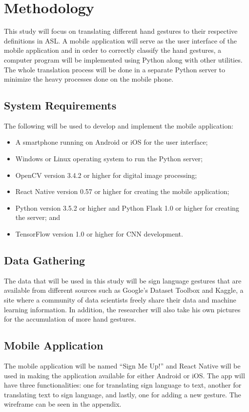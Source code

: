 \documentclass[journal]{./IEEE/IEEEtran}
\begin{document}
\section{Methodology}
This study will focus on translating different hand gestures to their respective definitions in ASL. A mobile application will serve as the user interface of the mobile application and in order to correctly classify the hand gestures, a computer program will be implemented using Python along with other utilities. The whole translation process will be done in a separate Python server to minimize the heavy processes done on the mobile phone.

\subsection{System Requirements}
The following will be used to develop and implement the mobile application:

\begin{itemize}
    \item A smartphone running on Android or iOS for the user interface;
    \item Windows or Linux operating system to run the Python server;
    \item OpenCV version 3.4.2 or higher for digital image processing;
    \item React Native version 0.57 or higher for creating the mobile application;
    \item Python version 3.5.2 or higher and Python Flask 1.0 or higher for creating the server; and
    \item TensorFlow version 1.0 or higher for CNN development.
\end{itemize}

\subsection{Data Gathering}
The data that will be used in this study will be sign language gestures that are available from different sources such as Google's Dataset Toolbox and Kaggle, a site where a community of data scientists freely share their data and machine learning information. In addition, the researcher will also take his own pictures for the accumulation of more hand gestures.

\subsection{Mobile Application}
The mobile application will be named ``Sign Me Up!'' and React Native will be used in making the application available for either Android or iOS. The app will have three functionalities: one for translating sign language to text, another for translating text to sign language, and lastly, one for adding a new gesture. The wireframe can be seen in the appendix.
\end{document}
